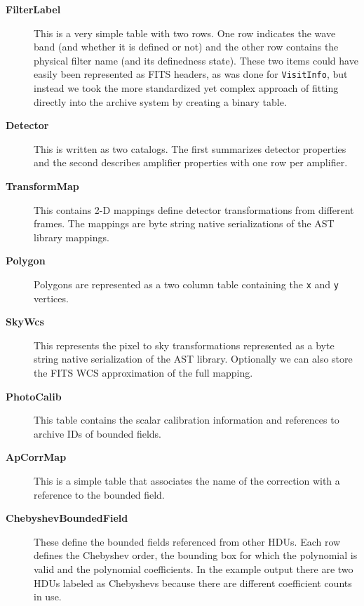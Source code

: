 \begin{description}

\item[\textbf{FilterLabel}]

This is a very simple table with two rows.
One row indicates the wave band (and whether it is defined or not) and the other row contains the physical filter name (and its definedness state).
These two items could have easily been represented as FITS headers, as was done for \texttt{VisitInfo}, but instead we took the more standardized yet complex approach of fitting directly into the archive system by creating a binary table.

\item[\textbf{Detector}]

This is written as two catalogs.
The first summarizes detector properties and the second describes amplifier properties with one row per amplifier.

\item[\textbf{TransformMap}]

This contains 2-D mappings define detector transformations from different frames.
The mappings are byte string native serializations of the AST library mappings.

\item[\textbf{Polygon}]

Polygons are represented as a two column table containing the \texttt{x} and \texttt{y} vertices.

\item[\textbf{SkyWcs}]

This represents the pixel to sky transformations represented as a byte string native serialization of the AST library.
Optionally we can also store the FITS WCS approximation of the full mapping.

\item[\textbf{PhotoCalib}]

This table contains the scalar calibration information and references to archive IDs of bounded fields.

\item[\textbf{ApCorrMap}]

This is a simple table that associates the name of the correction with a reference to the bounded field.

\item[\textbf{ChebyshevBoundedField}]

These define the bounded fields referenced from other HDUs.
Each row defines the Chebyshev order, the bounding box for which the polynomial is valid and the polynomial coefficients.
In the example output there are two HDUs labeled as Chebyshevs because there are different coefficient counts in use.


\end{description}
